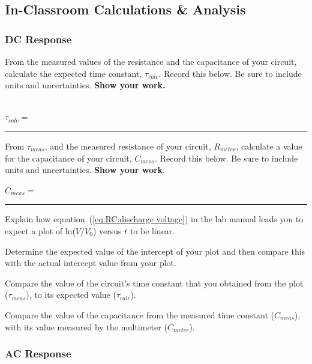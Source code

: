 \subsection{In-Classroom Calculations \& Analysis}

\subsubsection{DC Response}
From the measured values of the resistance and the capacitance of your circuit,
calculate the expected time constant,
$\tau _{calc}$. Record this below. Be sure to include units and uncertainties.
{\bf Show your work.}\\
\vspace*{0.5cm} \\
\begin{center}
$\tau _{calc}=$~ \rule{3cm}{.1mm} 
\end{center}

\noindent
From $\tau _{meas}$, and the measured resistance of your circuit, $R_{meter}$,
calculate a value for the capacitance of your circuit, $C_{meas}$. Record this
below. Be sure to include units and uncertainties. {\bf Show your work}.\\
\vspace*{0.5cm}
\begin{center}
$C_{meas}=$~ \rule{3cm}{.1mm} 
\end{center}
\noindent Explain how equation~(\ref{eq:RC:discharge voltage}) in the lab 
manual leads you to expect a plot of ln($V/V_0$)
versus $t$ to be linear.
\vspace*{3cm}

\noindent 
Determine the expected value of the intercept of your plot and then compare 
this with the actual intercept value from your plot.
\vspace*{2cm}

\noindent
Compare the value of the circuit's time constant that you obtained
from the plot ($\tau _{meas}$), to its expected value ($\tau _{calc}$).
\vspace*{3cm}

\noindent
Compare the value of the capacitance from the measured time constant ($C_{meas}$),
with its value measured by the multimeter ($C_{meter}$).
\vspace*{3cm}

\subsubsection{AC Response}  

